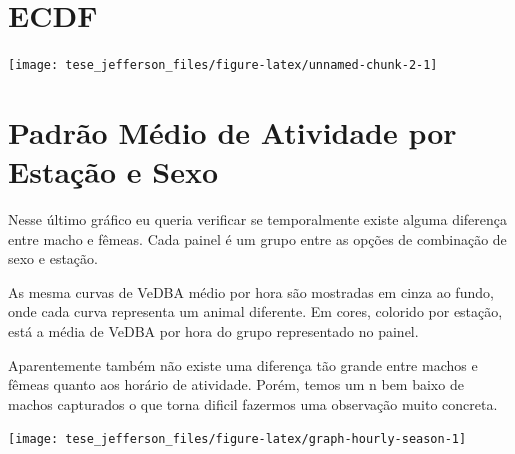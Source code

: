 \documentclass[english,msc,numbers,hidelinks]{coppe}
\begin{document}
  \hypertarget{ecdf}{%
  \section{ECDF}\label{ecdf}}
  \begin{center}\texttt{[image: tese\_jefferson\_files/figure-latex/unnamed-chunk-2-1]} \end{center}

  \newpage

  \hypertarget{padruxe3o-muxe9dio-de-atividade-por-estauxe7uxe3o-e-sexo}{%
  \section{Padrão Médio de Atividade por Estação e Sexo}\label{padruxe3o-muxe9dio-de-atividade-por-estauxe7uxe3o-e-sexo}}

  Nesse último gráfico eu queria verificar se temporalmente existe alguma diferença entre macho e fêmeas. Cada painel é um grupo entre as opções de combinação de sexo e estação.

  As mesma curvas de VeDBA médio por hora são mostradas em cinza ao fundo, onde cada curva representa um animal diferente. Em cores, colorido por estação, está a média de VeDBA por hora do grupo representado no painel.

  Aparentemente também não existe uma diferença tão grande entre machos e fêmeas quanto aos horário de atividade. Porém, temos um n bem baixo de machos capturados o que torna dificil fazermos uma observação muito concreta.
  \begin{center}\texttt{[image: tese\_jefferson\_files/figure-latex/graph-hourly-season-1]} \end{center}
\end{document}
